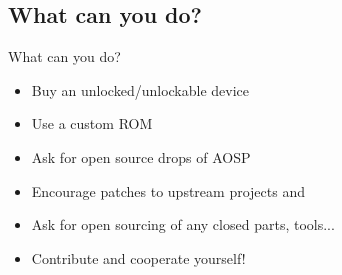 \documentclass[aspectratio=169]{beamer}
\begin{document}
  \subsection{What can you do?}
    \begin{frame}{What can you do?}
      \begin{itemize}
        \item Buy an unlocked/unlockable device
        \item Use a custom ROM
        \item Ask for open source drops of AOSP 
        \item Encourage patches to upstream projects and 
        \item Ask for open sourcing of any closed parts, tools...
        \item Contribute and cooperate yourself! 
      \end{itemize}
    \end{frame}
\end{document}
